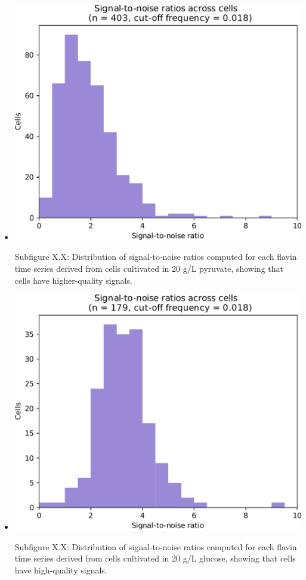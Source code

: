 \begin{itemize}
\begin{itemize}
\item \begin{center}
\includegraphics[width=.9\linewidth]{pyruvate_snr_edit.pdf}
\end{center} Subfigure X.X: Distribution of signal-to-noise ratios computed for each flavin time series derived from cells cultivated in 20 g/L pyruvate, showing that cells have higher-quality signals.
\item \begin{center}
\includegraphics[width=.9\linewidth]{glucose_snr_edit.pdf}
\end{center} Subfigure X.X: Distribution of signal-to-noise ratios computed for each flavin time series derived from cells cultivated in 20 g/L glucose, showing that cells have high-quality signals.
\end{itemize}
\end{itemize}

